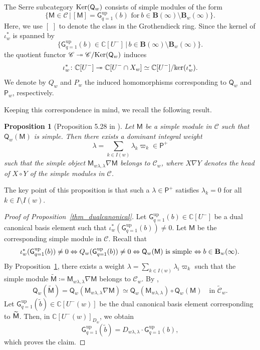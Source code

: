 \documentclass[11pt]{amsart}
\newcommand{\C}{\mathbb{C}}
\def\scr{\mathscr}
\numberwithin{equation}{section}
\theoremstyle{plain}
\newtheorem{proposition}[theorem]{Proposition}
\theoremstyle{definition}
\numberwithin{equation}{section}
\begin{document}
The Serre subcategory ${\rm Ker} (\mathsf Q_w)$ consists of simple modules of the form 
$$
\bigl\{ \mathsf{M} \in \scr{C} \, \vert \, [\mathsf{M}]=\mathsf{G}_{q=1}^{\mathrm{up}}(b) \,\, \text{for} \ b \in {\mathbf B}(\infty) \setminus {\mathbf B}_w(\infty) \bigr\}.
$$
Here, we use $[ \, \, ]$ to denote the class in the Grothendieck ring. Since the kernel of $\iota_w^*$ is spanned by 
$$
\bigl\{\mathsf{G}_{q=1}^{\mathrm{up}}(b) \in \C[U^-] \, \vert \,b \in \mathbf B(\infty) \setminus \mathbf B_w(\infty) \bigr\}.
$$
the quotient functor $\scr{C} \twoheadrightarrow\scr{C}/ {\rm Ker} (\mathsf Q_w)$ induces 
$$
\iota^*_w \colon \C[U^-]  \twoheadrightarrow \C[U^-\cap X_w] \simeq  \C[U^-] / {\rm ker}(\iota^*_w).
$$
We denote by $Q_w$ and $P_w$ the induced homomorphisms corresponding to $\mathsf Q_w$ and $\mathsf P_w$, respectively.

Keeping this correspondence in mind, we recall the following result.

\begin{proposition}[Proposition 5.28 in \cite{KN25}]\label{prop_KN25}
Let $\mathsf{M}$ be a simple module in $\scr{C}$ such that $\mathsf{Q}_w(\mathsf{M})$ is simple. Then there exists a dominant integral weight $$\lambda = \sum_{k \in I(w)} \lambda_k \varpi_k \in \mathsf{P}^+$$ such that the simple object $\mathsf{M}_{w \lambda, \lambda} \nabla \mathsf{M}$ belongs to  $\scr{C}_w$, where $X \nabla Y$ denotes the head of $X\circ Y$ of the simple modules in $\scr{C}$.
\end{proposition}

The key point of this proposition is that such a $\lambda \in \mathsf{P}^+$ satisfies $\lambda_k = 0$ for all $k \in I \setminus I(w)$.

\begin{proof}[Proof of Proposition~\ref{thm_dualcanonical}]
Let $\mathsf{G}^{\mathrm{up}}_{q=1}(b) \in \C[U^-]$ be a dual canonical basis element such that  ${\iota}^*_w (\mathsf{G}^{\mathrm{up}}_{q=1}(b)) \neq 0$. Let $\mathsf{M}$ be the corresponding simple module in $\scr{C}$. Recall that 
$$
\mbox{
${\iota}^*_w (\mathsf{G}^{\mathrm{up}}_{q=1}(b)) \neq 0 \Leftrightarrow Q_w (\mathsf{G}^{\mathrm{up}}_{q=1}(b)) \neq 0 \Leftrightarrow {\sf Q}_w(\sf{M})$ is simple $\Leftrightarrow b \in \mathbf{B}_w(\infty)$.
}
$$
By Proposition~\ref{prop_KN25}, there exists a weight $\lambda =\sum_{k \in I(w)} \lambda_i \varpi_k$ such that  the simple module $\widetilde{\mathsf{M}} \coloneqq \mathsf{M}_{w \lambda, \lambda} \nabla \mathsf{M}$ belongs to  $\scr{C}_w$.  
By \cite[Proposition 1.20]{KKOP23},
\begin{equation} \label{equ:QwMlaM}
\mathsf{Q}_w(\widetilde{\mathsf{M}}) = 
\mathsf{Q}_w(\mathsf{M}_{w \lambda, \lambda} \nabla \mathsf{M}) \simeq \mathsf{Q}_w(\mathsf{M}_{w \lambda, \lambda}) \circ \mathsf{Q}_w(\mathsf{M}) \quad \mbox{in $\widetilde{\scr{C}}_w$}.
\end{equation}
Let $\mathsf{G}^{\mathrm{up}}_{q=1}(\widetilde{b}) \in \C[U^-(w)]$ be the dual canonical basis element corresponding to $\sf{\widetilde{M}}$. Then, in $\C[U^-(w)]_{D_w}$, we obtain 
$$
\mathsf{G}^{\mathrm{up}}_{q=1}(\widetilde{b}) = D_{w \lambda, \lambda} \cdot \mathsf{G}^{\mathrm{up}}_{q=1}(b),
$$
which proves the claim.
\end{proof}
\end{document}
